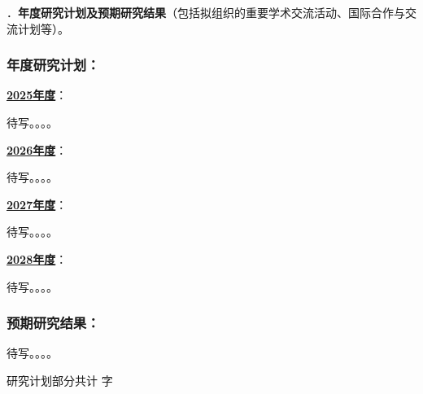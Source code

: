 {\sihao \color{MsBlue} ．{\bfseries 年度研究计划及预期研究结果}（包括拟组织的重要学术交流活动、国际合作与交流计划等）。}

\subsubsection{{\bfseries 年度研究计划：}}

\uline{\bfseries 2025年度}：

待写。。。。

\uline{\bfseries 2026年度}：

待写。。。。

\uline{\bfseries 2027年度}：

待写。。。。

\uline{\bfseries 2028年度}：

待写。。。。


\subsubsection{{\bfseries 预期研究结果：}}

待写。。。。


\ifhandout
\else
\begin{center}
{\larger[2]\color{red}  研究计划部分共计 \wordcount 字 }
\end{center}
\fi


\vskip 5mm
